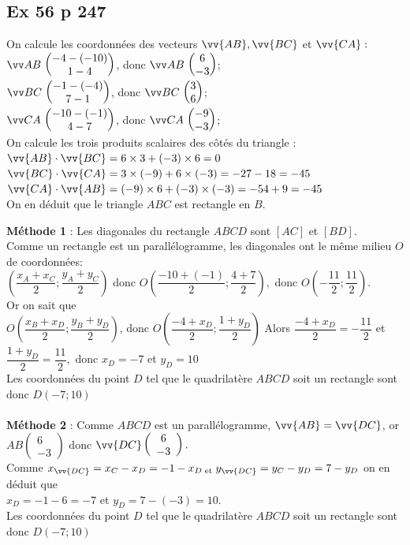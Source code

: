 \documentclass[12pt,a4paper]{book}
\begin{document}
\subsection*{Ex 56 p 247}
\begin{enumMet}
    \item On calcule les coordonnées des vecteurs $\vv{A B}, \vv{B C}$ et $\vv{C A}:$\\
    $\Coord{AB}{-4-(-10)}{1-4}$, donc $\Coord{AB}{6}{-3}$;\\
    $\Coord{BC}{-1-(-4)}{7-1}$, donc $\Coord{BC}{3}{6}$;\\
    $\Coord{CA}{-10-(-1)}{4-7}$, donc $\Coord{CA}{-9}{-3}$;\\
    On calcule les trois produits scalaires des côtés du triangle :\\
    $\vv{A B} \cdot \vv{B C}=6 \times 3+(-3) \times 6=0$\\
    $\vv{B C} \cdot \vv{C A}=3 \times(-9)+6 \times(-3)=-27-18=-45$\\
    $\vv{C A} \cdot \vv{A B}=(-9) \times 6+(-3) \times(-3)=-54+9=-45$\\
    On en déduit que le triangle $A B C$ est rectangle en $B$.
    \item \textbf{Méthode 1} : Les diagonales du rectangle $A B C D$ sont $[A C]$ et $[B D]$.\\
    Comme un rectangle est un parallélogramme, les diagonales ont le même milieu $O$ de coordonnées:\\
    $\left(\dfrac{x_{A}+x_{C}}{2} ; \dfrac{y_{A}+y_{C}}{2}\right)$ donc $ O\left(\dfrac{-10+(-1)}{2} ; \dfrac{4+7}{2}\right),$ donc $O\left(-\dfrac{11}{2} ; \dfrac{11}{2}\right)$.\\ Or on sait que\\
    $O\left(\dfrac{x_{B}+x_{D}}{2} ; \dfrac{y_{B}+y_{D}}{2}\right)$, donc $ O\left(\dfrac{-4+x_{D}}{2} ; \dfrac{1+y_{D}}{2}\right)$ Alors $ \dfrac{-4+x_{D}}{2}=-\dfrac{11}{2}$ et
    $\dfrac{1+y_{D}}{2}=\dfrac{11}{2},$ donc $x_{D}=-7$ et $y_{D}=10$\\
    Les coordonnées du point $D$ tel que le quadrilatère $A B C D$ soit un rectangle sont donc $D(-7 ; 10)$\\
    \ \\
    \textbf{Méthode 2} : Comme $A B C D$ est un parallélogramme, $\vv{A B}=\vv{D C}$, or ${A B}\left(\begin{array}{c}6 \\ -3\end{array}\right)$ donc $\vv{D C}\left(\begin{array}{c}6 \\ -3\end{array}\right).$\\
    Comme $x_{\vv{D C}}=x_{C}-x_{D}=-1-x_{D \text { et }} y_{\vv{D C}}=y_{C}-y_{D}=7-y_{D}$ on en déduit que\\
    $x_{D}=-1-6=-7$ et $y_{D}=7-(-3)=10$.\\
    Les coordonnées du point $D$ tel que le quadrilatère $A B C D$ soit un rectangle sont donc $D(-7 ; 10)$
\end{enumMet}
\end{document}

